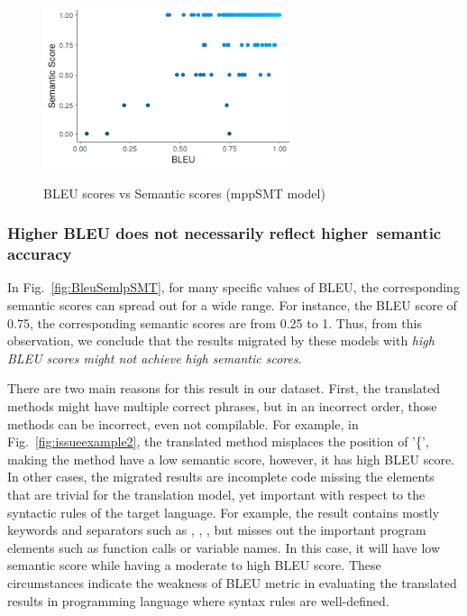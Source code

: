 \begin{figure}
\caption{BLEU scores vs Semantic scores (mppSMT model)}
\centering
\includegraphics[width=2.9in]{img/bleuvssemantic_mppSMT.png}
\label{fig:BleuSemMppSMT}
\end{figure}

\subsubsection{{\bf Higher BLEU does not necessarily reflect higher~semantic accuracy}}

In Fig.~\ref{fig:BleuSemlpSMT}, for many specific values of BLEU, the
corresponding semantic scores can spread out for a wide range. For
instance, the BLEU score of 0.75, the corresponding semantic scores
are from 0.25 to 1.
Thus, from this observation, we conclude that the results migrated by
these models with {\em high BLEU scores might not achieve high semantic
scores}.
%

There are two main reasons for this result in our dataset.  First, the
translated methods might have multiple correct phrases, but in an
incorrect order, those methods can be incorrect, even not compilable.
%
For example, in Fig.~\ref{fig:issueexample2}, the translated method
misplaces the position of '\{', making the method have a low
semantic score, however, it has high BLEU score.
%
In other cases, the migrated results are incomplete code missing the
elements that are trivial for the translation model, yet important
with respect to the syntactic rules of the target language. For
example, the result contains mostly keywords and separators such as
, , \code{()}, but misses out the important
program elements such as function calls or variable names. In this
case, it will have low semantic score while having a moderate to high
BLEU score. These circumstances indicate the weakness of BLEU metric
in evaluating the translated results in programming language where
syntax rules are well-defined.



